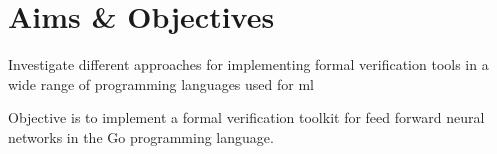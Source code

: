 

\section{Aims \& Objectives}

Investigate different approaches for implementing formal verification tools in a wide range of programming 
languages used for \gls{ml}

Objective is to implement a formal verification toolkit for feed forward neural networks in the Go programming language.
